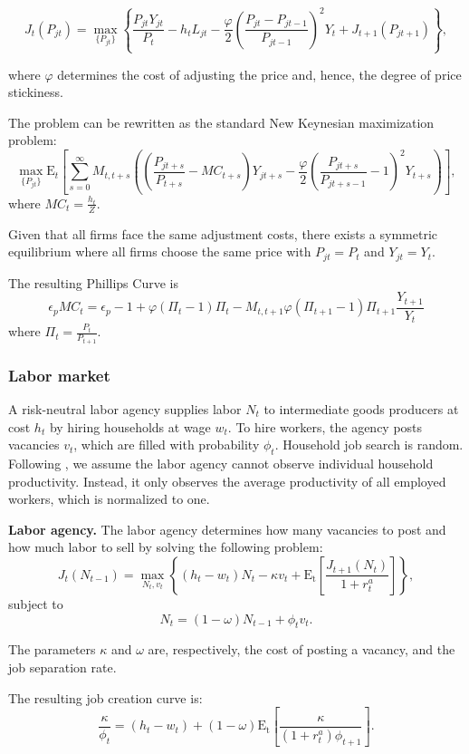 $$J_{t}\left(P_{jt}\right) = \max_{\{P_{jt}\}} \left\{\frac{P_{jt}Y_{jt}}{P_{t}} - h_{t} L_{jt} -  \frac{\varphi}{2}\left( \frac{P_{jt} - P_{jt-1}}{P_{jt-1}} \right)^{2} Y_{t}  + J_{t+1}\left(P_{jt+1}\right) \right\},$$ 

where $\varphi$ determines the cost of adjusting the price and, hence, the degree of price stickiness. 

The problem can be rewritten as the standard New Keynesian maximization problem:
$$\max_{\{P_{jt}\}} \mathrm{E}_{t}\left[\sum_{s=0}^{\infty}  M_{t,t+s} \left( \left( \frac{P_{jt+s}}{P_{t+s}} - MC_{t+s}\right)Y_{jt+s} -  \frac{\varphi}{2}\left( \frac{P_{jt+s}}{P_{jt+s-1}} - 1\right)^{2} Y_{t+s} \right)\right],$$ 
where $MC_{t} = \frac{h_{t}}{Z}$.

Given that all firms face the same adjustment costs, there exists a symmetric equilibrium where all firms choose the same price with $P_{jt}=P_{t}$ and $Y_{jt}=Y_{t}$.

The resulting Phillips Curve is
$$ \epsilon_{p} MC_{t} = \epsilon_{p} - 1 + \varphi ( \Pi_{t} -1) \Pi_{t} - M_{t,t+1} \varphi (\Pi_{t+1} -1 ) \Pi_{t+1} \frac{Y_{t+1}}{Y_{t}}$$
where $\Pi_{t} = \frac{P_{t}}{P_{t+1}}$. 

\subsubsection{Labor market}

A risk-neutral labor agency supplies labor \( N_t \) to intermediate goods producers at cost \( h_t \) by hiring households at wage \( w_t \). To hire workers, the agency posts vacancies \( v_t \), which are filled with probability \( \phi_t \). Household job search is random. Following \cite{Bardoczy2022}, we assume the labor agency cannot observe individual household productivity. Instead, it only observes the average productivity of all employed workers, which is normalized to one.


\textbf{Labor agency.} The labor agency determines how many vacancies to post and how much labor to sell by solving the following problem: 
$$J_{t}(N_{t-1})  = \max_{N_{t},v_{t}} \left\{( h_{t} - w_{t}) N_{t}- \kappa v_{t} + \mathrm{E_{t}}\left[ \frac{J_{t+1}(N_{t})}{1 + r^{a}_{t}}\right]\right\},$$
subject to
$$ N_{t} = (1-\omega)N_{t-1} + \phi_{t} v_{t}.$$ 

The parameters $\kappa$ and $\omega$ are, respectively, the cost of posting a vacancy, and the job separation rate. 

The resulting job creation curve is:
$$ \frac{\kappa}{\phi_{t}}  = (h_{t} - w_{t})+  (1-\omega)\mathrm{E_{t}}\left[   \frac{\kappa}{(1+r^{a}_{t}) \phi_{t+1}} \right].$$

